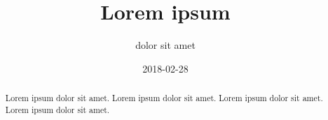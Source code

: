 \documentclass[a4j, uplatex]{jsarticle}
\numberwithin{equation}{section}
\numberwithin{figure}{section}
\numberwithin{table}{section}
\begin{document}
\title{Lorem ipsum}
\author{dolor sit amet}
\date{2018-02-28}

\maketitle

\begin{abstract}
Lorem ipsum dolor sit amet. Lorem ipsum dolor sit amet.
Lorem ipsum dolor sit amet. Lorem ipsum dolor sit amet.
\end{abstract}

\tableofcontents



\printbibliography[title=References]

\appendix
\begin{refsection}


\printbibliography[title=References]
\end{refsection}
\end{document}
